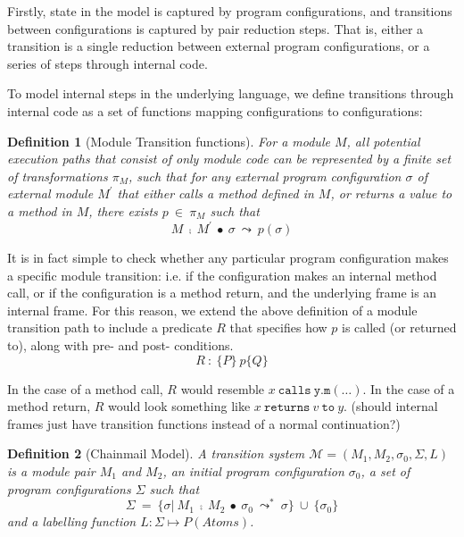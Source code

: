 \documentclass[12pt]{article}
\newtheorem{definition}{Definition}
\begin{document}
	Firstly, state in the model is captured by program configurations, and transitions between configurations 
	is captured by pair reduction steps. That is, either a transition is a single reduction between external program
	configurations, or a series of steps through internal code.
	
	
	To model internal steps in the underlying language, we define transitions through internal code as a set of 
	functions mapping configurations to configurations:
	
	\begin{definition}[Module Transition functions]
	For a module $M$, all potential execution paths that consist of only module code
	can be represented by a finite set of transformations $\pi_M$, such that for any 
	external program configuration $\sigma$ of external module $M^\prime$ that either calls a method defined in $M$,
	or returns a value to a method in $M$, there exists $p\ \in\ \pi_M$ such that
	$$M\ \fcmp\ M^\prime\ \bullet\ \sigma\ \leadsto\ p(\sigma)$$
	\end{definition}
	
	It is in fact simple to check whether any particular program configuration makes a specific 
	module transition: i.e. if the configuration makes an internal method call, or if the 
	configuration is a method return, and the underlying frame is an internal frame.
	For this reason, we extend the above definition of a module transition path to include a predicate $R$
	that specifies how $p$ is called (or returned to), along with pre- and post- conditions.
	$$R\ :\ \{P\}\ p \{Q\}$$
	
	In the case of a method call, $R$ would resemble $x\ \texttt{calls}\ \texttt{y}.\texttt{m}(\ldots) $.
	In the case of a method return, $R$ would look something like $x\ \texttt{returns}\ v\ \texttt{to}\ y$.
	(should internal frames just have transition functions instead of a normal continuation?)
	
	\begin{definition}[Chainmail Model]
	A transition system $\mathcal{M} = (M_1, M_2, \sigma_0, \Sigma, L)$ 
	is a module pair $M_1$ and $M_2$,
	an initial program configuration $\sigma_0$,
	a set of program configurations $\Sigma$ such that
	$$\Sigma\ =\ \{ \sigma \vert\ M_1\ \fcmp\ M_2\ \bullet\ \sigma_0\ \leadsto^*\ \sigma \}\ \cup\ \{\sigma_0\} $$
	and a labelling function
	$L : \Sigma \mapsto P(Atoms)$.
	\end{definition}
	
	
	
\end{document}
